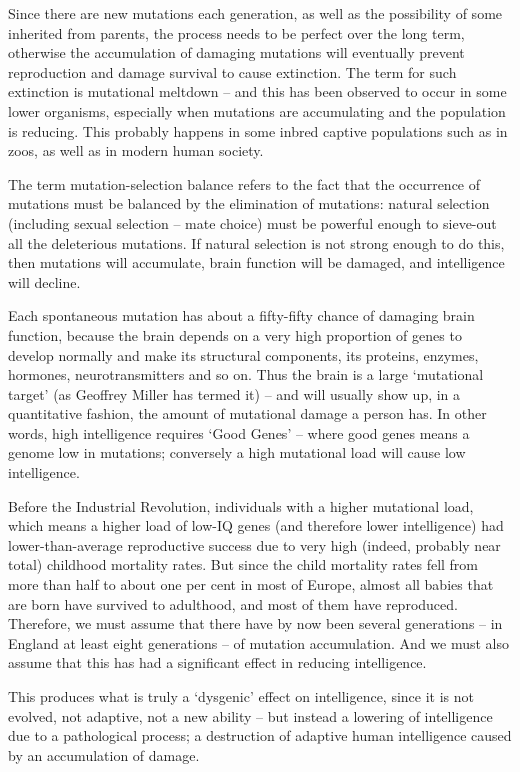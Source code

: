 \documentclass[
]{book}
\begin{document}
Since there are new mutations each generation, as well as the possibility of some inherited from parents, the process needs to be perfect over the long term, otherwise the accumulation of damaging mutations will eventually prevent reproduction and damage survival to cause extinction. The term for such extinction is mutational meltdown -- and this has been observed to occur in some lower organisms, especially when mutations are accumulating and the population is reducing. This probably happens in some inbred captive populations such as in zoos, as well as in modern human society.

The term mutation-selection balance refers to the fact that the occurrence of mutations must be balanced by the elimination of mutations: natural selection (including sexual selection -- mate choice) must be powerful enough to sieve-out all the deleterious mutations. If natural selection is not strong enough to do this, then mutations will accumulate, brain function will be damaged, and intelligence will decline.

Each spontaneous mutation has about a fifty-fifty chance of damaging brain function, because the brain depends on a very high proportion of genes to develop normally and make its structural components, its proteins, enzymes, hormones, neurotransmitters and so on. Thus the brain is a large `mutational target' (as Geoffrey Miller has termed it) -- and will usually show up, in a quantitative fashion, the amount of mutational damage a person has. In other words, high intelligence requires `Good Genes' -- where good genes means a genome low in mutations; conversely a high mutational load will cause low intelligence.

Before the Industrial Revolution, individuals with a higher mutational load, which means a higher load of low-IQ genes (and therefore lower intelligence) had lower-than-average reproductive success due to very high (indeed, probably near total) childhood mortality rates. But since the child mortality rates fell from more than half to about one per cent in most of Europe, almost all babies that are born have survived to adulthood, and most of them have reproduced. Therefore, we must assume that there have by now been several generations -- in England at least eight generations -- of mutation accumulation. And we must also assume that this has had a significant effect in reducing intelligence.

This produces what is truly a `dysgenic' effect on intelligence, since it is not evolved, not adaptive, not a new ability -- but instead a lowering of intelligence due to a pathological process; a destruction of adaptive human intelligence caused by an accumulation of damage.
\end{document}
